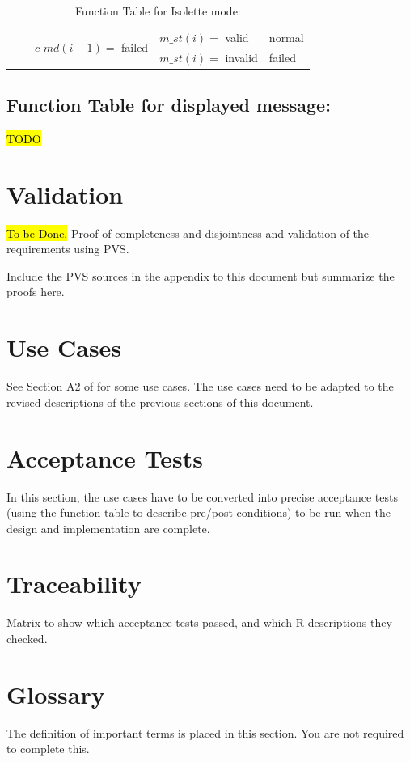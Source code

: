 \documentclass[fontsize=12pt,paper=letter,twoside]{scrartcl}
\begin{document}
\begin{table}[htb]
\begin{tabular}{llll|l|}
\multicolumn{1}{|l|}{}                                  & \multicolumn{1}{l|}{}                            & \multicolumn{1}{l|}{\multirow{2}{*}{$c\_md(i-1) =$ failed}}   & $m\_st(i) =$ valid   & normal \\ \cline{4-5}
\multicolumn{1}{|l|}{}                                  & \multicolumn{1}{l|}{}                            & \multicolumn{1}{l|}{}                                     & $m\_st(i) =$ invalid & failed   \\ \hline
\end{tabular}
\caption{Function Table for Isolette mode: }
\end{table}

\subsection{Function Table for displayed message: }
\hl{TODO}

\section{Validation}
\hl{To be Done.}
Proof of completeness and disjointness and validation of the requirements using PVS.

Include the PVS sources in the appendix to this document but summarize the proofs here.

\section{Use Cases}
See Section A2 of \cite{REMH} for some use cases. The use cases need to be adapted to the revised descriptions of the previous sections of this document.

\section{Acceptance Tests}
In this section, the use cases have to be converted into precise acceptance tests (using the function table to describe pre/post conditions) to be run when the design and implementation are complete.

\section{Traceability}
Matrix to show which acceptance tests passed, and which R-descriptions they checked.

\section{Glossary}
The definition of important terms is placed in this section. You are not required to complete this.



\end{document}
